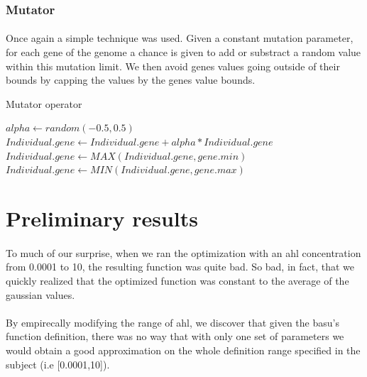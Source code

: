\documentclass{article}
\begin{document}
    \subsubsection{Mutator} %
    \label{ssub:Mutator}
    
      \paragraph{} %
      \label{par:}
        Once again a simple technique was used. Given a constant mutation parameter,
        for each gene of the genome a chance is given to add or substract a random value
        within this mutation limit. We then avoid genes values going outside of their
        bounds by capping the values by the genes value bounds.

      \begin{algorithm}
      \caption{Mutator operator}\label{pseudo2}
      \begin{algorithmic}[2]
          \State $alpha\gets random(-0.5, 0.5)$ 
          \State $Individual.gene\gets Individual.gene + alpha * Individual.gene$
          \State $Individual.gene\gets MAX(Individual.gene, gene.min)$
          \State $Individual.gene\gets MIN(Individual.gene, gene.max)$
        \EndIf
      \EndFor
      \EndProcedure
      \end{algorithmic}
      \end{algorithm}


  \section{Preliminary results} %
  \label{sec:Preliminaty Result}
    
    \paragraph{} %
    \label{par:}
      To much of our surprise, when we ran the optimization with an ahl concentration
      from 0.0001 to 10, the resulting function was quite bad. So bad, in fact, that
      we quickly realized that the optimized function was constant to the average of
      the gaussian values.
    
    \paragraph{} %
    \label{par:}
      By empirecally modifying the range of ahl, we discover that given the basu's
      function definition, there was no way that with only one set of parameters we would
      obtain a good approximation on the whole definition range specified in the
      subject (i.e [0.0001,10]). 
\end{document}
